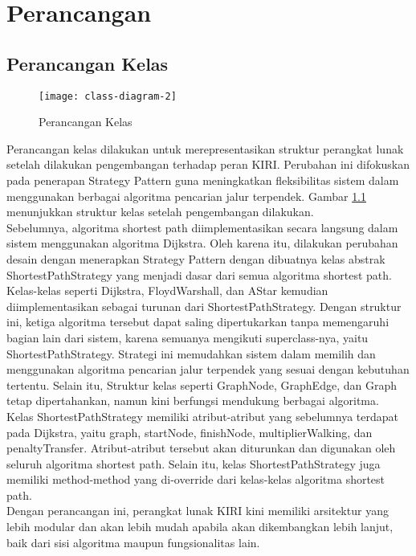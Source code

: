 \chapter{Perancangan}
\label{chap:perancangan}

\section{Perancangan Kelas}
\label{sec:rancangandiagramkelas}

\begin{figure}[H] 
    \centering  
    \texttt{[image: class-diagram-2]}  
    \caption{Perancangan Kelas}
    \label{fig:rancangandiagramkelas} 
\end{figure}

\noindent
Perancangan kelas dilakukan untuk merepresentasikan struktur perangkat lunak setelah dilakukan pengembangan terhadap peran KIRI. Perubahan ini difokuskan pada penerapan Strategy Pattern guna meningkatkan fleksibilitas sistem dalam menggunakan berbagai algoritma pencarian jalur terpendek. Gambar \ref{fig:rancangandiagramkelas} menunjukkan struktur kelas setelah pengembangan dilakukan.
\\
Sebelumnya, algoritma shortest path diimplementasikan secara langsung dalam sistem menggunakan algoritma Dijkstra. Oleh karena itu, dilakukan perubahan desain dengan menerapkan Strategy Pattern dengan dibuatnya kelas abstrak ShortestPathStrategy yang menjadi dasar dari semua algoritma shortest path. Kelas-kelas seperti Dijkstra, FloydWarshall, dan AStar kemudian diimplementasikan sebagai turunan dari ShortestPathStrategy. Dengan struktur ini, ketiga algoritma tersebut dapat saling dipertukarkan tanpa memengaruhi bagian lain dari sistem, karena semuanya mengikuti superclass-nya, yaitu ShortestPathStrategy. Strategi ini memudahkan sistem dalam memilih dan menggunakan algoritma pencarian jalur terpendek yang sesuai dengan kebutuhan tertentu. Selain itu, Struktur kelas seperti GraphNode, GraphEdge, dan Graph tetap dipertahankan, namun kini berfungsi mendukung berbagai algoritma.
\\
Kelas ShortestPathStrategy memiliki atribut-atribut yang sebelumnya terdapat pada Dijkstra, yaitu graph, startNode, finishNode, multiplierWalking, dan penaltyTransfer. Atribut-atribut tersebut akan diturunkan dan digunakan oleh seluruh algoritma shortest path. Selain itu, kelas ShortestPathStrategy juga memiliki method-method yang di-override dari kelas-kelas algoritma shortest path.
\\
Dengan perancangan ini, perangkat lunak KIRI kini memiliki arsitektur yang lebih modular dan akan lebih mudah apabila akan dikembangkan lebih lanjut, baik dari sisi algoritma maupun fungsionalitas lain.


